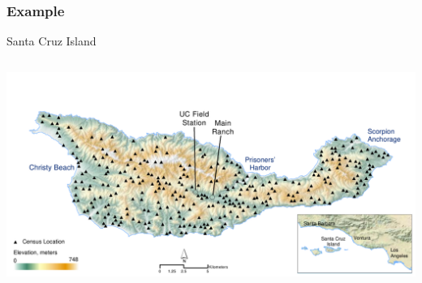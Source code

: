 \documentclass[color=usenames,dvipsnames]{beamer}\usepackage[]{graphicx}\usepackage[]{color}
\begin{document}
\begin{frame}[plain]
  \frametitle{Example}
  \Huge
  \centering
    Santa Cruz Island \\
  \begin{columns}
    \column{\dimexpr\paperwidth-20pt}
    \includegraphics[width=\textwidth]{figs/Santa-Cruz} \\
  \end{columns}
\end{frame}
\end{document}

